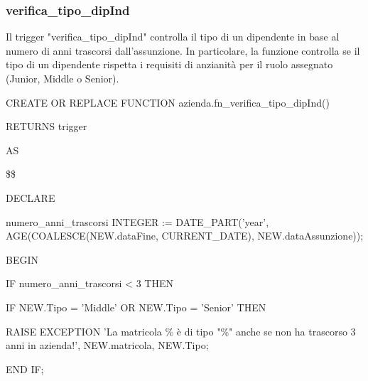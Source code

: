         \subsubsection{verifica\_tipo\_dipInd}
        Il trigger "verifica\_tipo\_dipInd" controlla il tipo di un dipendente in base al numero di anni trascorsi dall'assunzione. In particolare, la funzione controlla se il tipo di un dipendente rispetta i requisiti di anzianità per il ruolo assegnato (Junior, Middle o Senior).
        \ttfamily
            \begin{flushleft}
                \begin{description}
                    \item CREATE OR REPLACE FUNCTION azienda.fn\_verifica\_tipo\_dipInd()  
                    \item RETURNS trigger
                    \item AS
                    \item \$\$
                    \item DECLARE
                    \begin{description}
                        \item numero\_anni\_trascorsi INTEGER := DATE\_PART('year', AGE(COALESCE(NEW.dataFine, CURRENT\_DATE), NEW.dataAssunzione));
                    \end{description}
                    \item BEGIN 
                    \begin{description}
                            \item IF numero\_anni\_trascorsi < 3 THEN
                            \begin{description}
                                \item IF NEW.Tipo = 'Middle' OR NEW.Tipo = 'Senior' THEN
                                \begin{description}
                                    \item RAISE EXCEPTION 'La matricola \% è di tipo "\%" anche se non ha trascorso 3 anni in azienda!', NEW.matricola, NEW.Tipo;
                                \end{description}
                                \item END IF;
                            \end{description}


\end{description}
\end{description}
\end{flushleft}
